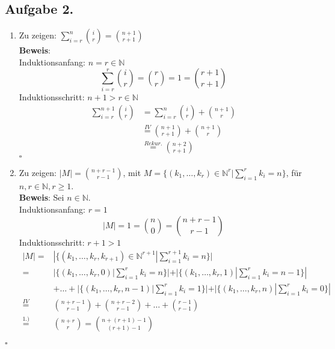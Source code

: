 \documentclass[11pt,a4paper,ngerman]{article}
\begin{document}
\subsection*{Aufgabe 2.}
\begin{enumerate}
  \item Zu zeigen: $\sum_{i=r}^{n}{\binom{i}{r}} = \binom{n+1}{r+1}$ \\
        \textbf{Beweis}:\\
        Induktionsanfang: $n = r \in \mathbb{N}$
        \begin{equation*}
          \sum_{i=r}^{r}{\binom{i}{r}} = \binom{r}{r} = 1 = \binom{r+1}{r+1}
        \end{equation*}
        Induktionsschritt: $n+1 > r \in \mathbb{N}$
        \begin{equation*}\begin{split}
          \sum_{i=r}^{n+1}{\binom{i}{r}} &= \sum_{i=r}^{n}{\binom{i}{r}} + \binom{n+1}{r} \\
          &\stackrel{IV}{=} \binom{n+1}{r+1} + \binom{n+1}{r}\\
          &\stackrel{Rekur.}{=} \binom{n+2}{r+1}
        \end{split}\end{equation*}
\mbox{}\hfill$\square$
  \item Zu zeigen: $|M| =\binom{n+r-1}{r-1}$, mit $M =  \{ (k_1,\ldots,k_r) \in \mathbb{N}^r | \sum_{i=1}^r k_i = n\} $, für $n,r \in \mathbb{N}, r \geq 1$. \\
        \textbf{Beweis}: Sei $n \in \mathbb{N}$.\\
        Induktionsanfang: $r = 1$
        \begin{equation*}
           |M| \stackrel{}{=} 1 = \binom{n}{0} = \binom{n+r-1}{r-1}
        \end{equation*}
        Induktionsschritt: $r+1 > 1$
        \begin{equation*}\begin{split}
            |M| =&  |\{ (k_1,\ldots,k_r,k_{r+1}) \in \mathbb{N}^{r+1} | \sum_{i=1}^{r+1} k_i = n\}| \\
              =& |\{ (k_1,\ldots,k_r,0)| \sum_{i=1}^r k_i = n\}|
               + |\{ (k_1,\ldots,k_r,1)| \sum_{i=1}^r k_i = n-1\}| \\
              &+ \ldots 
              + |\{ (k_1,\ldots,k_r,n-1)| \sum_{i=1}^r k_i = 1\}|
               + |\{ (k_1,\ldots,k_r,n) | \sum_{i=1}^r k_i = 0\}| \\
              \stackrel{IV}{=}& \binom{n+r-1}{r-1} + \binom{n+r-2}{r-1} + \ldots + \binom{r-1}{r-1} \\
              \stackrel{1.)}{=}& \binom{n+r}{r} = \binom{n+(r+1)-1}{(r+1)-1}
        \end{split}\end{equation*}
\end{enumerate}
\mbox{}\hfill$\square$
\end{document}
